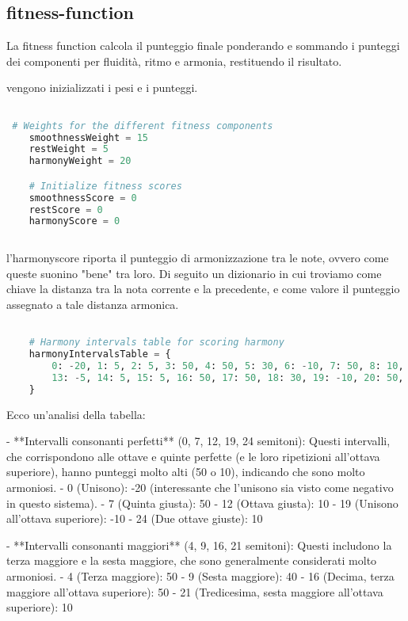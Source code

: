 \documentclass[a4paper,12pt]{report}
\begin{document}
\subsection*{fitness-function}

La fitness function calcola il punteggio finale ponderando e sommando i punteggi dei componenti per fluidità, ritmo e armonia, restituendo il risultato.

vengono inizializzati i pesi e i punteggi.

\begin{lstlisting}[language=Python]

 # Weights for the different fitness components
    smoothnessWeight = 15
    restWeight = 5
    harmonyWeight = 20

    # Initialize fitness scores
    smoothnessScore = 0
    restScore = 0
    harmonyScore = 0
    
\end{lstlisting}

l'harmonyscore riporta il punteggio di armonizzazione tra le note, ovvero come queste suonino "bene" tra loro.
Di seguito un dizionario in cui troviamo come chiave la distanza tra la nota corrente e la precedente, e come valore il punteggio assegnato a tale distanza armonica.

\begin{lstlisting}[language=Python]

    # Harmony intervals table for scoring harmony
    harmonyIntervalsTable = {
        0: -20, 1: 5, 2: 5, 3: 50, 4: 50, 5: 30, 6: -10, 7: 50, 8: 10, 9: 40, 10: -2, 11: -2, 12: 10,
        13: -5, 14: 5, 15: 5, 16: 50, 17: 50, 18: 30, 19: -10, 20: 50, 21: 10, 22: 40, 23: -2, 24: -2, 25: 10
    }

\end{lstlisting}

Ecco un'analisi della tabella:

- **Intervalli consonanti perfetti** (0, 7, 12, 19, 24 semitoni): Questi intervalli, che corrispondono alle ottave e quinte perfette (e le loro ripetizioni all'ottava superiore), hanno punteggi molto alti (50 o 10), indicando che sono molto armoniosi.
    - 0 (Unisono): -20 (interessante che l'unisono sia visto come negativo in questo sistema).
    - 7 (Quinta giusta): 50
    - 12 (Ottava giusta): 10
    - 19 (Unisono all'ottava superiore): -10
    - 24 (Due ottave giuste): 10

- **Intervalli consonanti maggiori** (4, 9, 16, 21 semitoni): Questi includono la terza maggiore e la sesta maggiore, che sono generalmente considerati molto armoniosi.
    - 4 (Terza maggiore): 50
    - 9 (Sesta maggiore): 40
    - 16 (Decima, terza maggiore all'ottava superiore): 50
    - 21 (Tredicesima, sesta maggiore all'ottava superiore): 10
\end{document}
